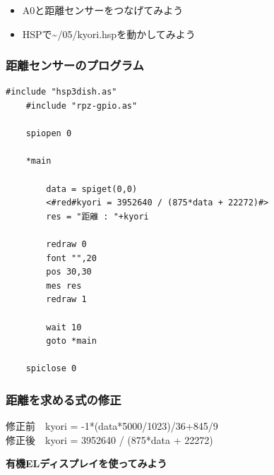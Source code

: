 \begin{frame}[fragile]
\begin{columns}
\begin{column}{0.48\textwidth}
        \end{column}
    \end{columns}
    \begin{itemize}
        \item A0と距離センサーをつなげてみよう
        \item HSPで\textasciitilde/05/kyori.hspを動かしてみよう
    \end{itemize}
\end{frame}

\begin{frame}[fragile]
    \frametitle{距離センサーのプログラム}
    \begin{lstlisting}[title=\textasciitilde/05/kyori.hsp]
    #include "hsp3dish.as"
    #include "rpz-gpio.as"

    spiopen 0

    *main

	    data = spiget(0,0)
	    <#red#kyori = 3952640 / (875*data + 22272)#>
	    res = "距離 : "+kyori
	
	    redraw 0
	    font "",20
	    pos 30,30
	    mes res
	    redraw 1

	    wait 10
	    goto *main

    spiclose 0
    \end{lstlisting}
\end{frame}

\begin{frame}
    \frametitle{距離を求める式の修正}
    修正前　kyori = -1*(data*5000/1023)/36+845/9\\
    \vspace{20pt}
	修正後　kyori = 3952640 / (875*data + 22272)
\end{frame}

\begin{frame}[plain]
    \begin{center}
        \vspace{48pt}
        {\huge\bf 有機ELディスプレイを使ってみよう}
    \end{center}
\end{frame}

